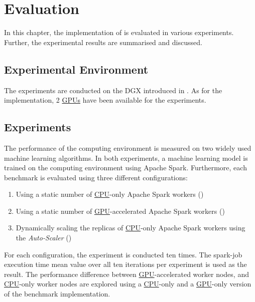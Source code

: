 \chapter{Evaluation}
\label{chap:07_evaluation}

In this chapter, the implementation of  is evaluated in various experiments. Further, the experimental results are summarised and discussed.

\section{Experimental Environment}
%
The experiments are conducted on the DGX introduced in .
As for the implementation, 2 \hyperlink{abbr:gpu}{GPUs} have been available for the experiments.


\section{Experiments}
The performance of the computing environment is measured on two widely used machine learning algorithms.
In both experiments, a machine learning model is trained on the computing environment using Apache Spark. Furthermore, each benchmark is evaluated using three different configurations:
\begin{enumerate}
\item Using a static number of \hyperlink{abbr:cpu}{CPU}-only Apache Spark workers ()
\item Using a static number of \hyperlink{abbr:gpu}{GPU}-accelerated Apache Spark workers ()
\item Dynamically scaling the replicas of \hyperlink{abbr:cpu}{CPU}-only Apache Spark workers using the \textit{Auto-Scaler} ()
\end{enumerate}
For each configuration, the experiment is conducted ten times. The spark-job execution time mean value over all ten iterations per experiment is used as the result.
The performance difference between \hyperlink{abbr:gpu}{GPU}-accelerated worker nodes, and \hyperlink{abbr:cpu}{CPU}-only worker nodes are explored using a \hyperlink{abbr:cpu}{CPU}-only and a \hyperlink{abbr:gpu}{GPU}-only version of the benchmark implementation.

